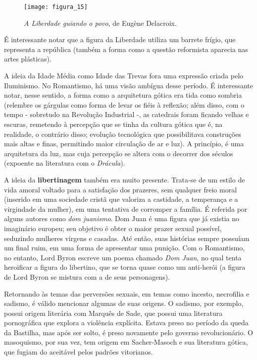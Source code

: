 \documentclass[12pt]{book}
\begin{document}
		\begin{figure}[h]
			\centering
			\texttt{[image: figura\_15]}
			\caption{\textit{A Liberdade guiando o povo}, de Eugène Delacroix.}
			\label{fig:mesh15}
		\end{figure}
		\par É interessante notar que a figura da Liberdade utiliza um barrete frígio, que representa a república (também a forma como a questão reformista aparecia nas artes plásticas).
		\par A ideia da Idade Média como Idade das Trevas fora uma expressão criada pelo Iluminismo. No Romantismo, há uma visão ambígua desse período. É interessante notar, nesse sentido, a forma como a arquitetura gótica era tida como sombria (relembre os gárgulas como forma de levar os fiéis à reflexão; além disso, com o tempo - sobretudo na Revolução Industrial -, as catedrais foram ficando velhas e escuras, remetendo à percepção que se tinha da cultura gótica que é, na realidade, o contrário disso; evolução tecnológica que possibilitava construções mais altas e finas, permitindo maior circulação de ar e luz). A princípio, é uma arquitetura da luz, mas cuja percepção se altera com o decorrer dos séculos (expoente na literatura com o \textit{Drácula}).
		\par A ideia da \textbf{libertinagem} também era muito presente. Trata-se de um estilo de vida amoral voltado para a satisfação dos prazeres, sem qualquer freio moral (inserido em uma sociedade cristã que valoriza a castidade, a temperança e a virgindade da mulher), em uma tentativa de corromper a família. É referida por alguns autores como \textit{dom juanismo}. Dom Juan é uma figura que já existia no imaginário europeu; seu objetivo é obter o maior prazer sexual possível, seduzindo mulheres virgens e casadas. Até então, suas histórias sempre possuíam um final ruim, em uma forma de apresentar uma punição. Com o Romantismo, no entanto, Lord Byron escreve um poema chamado \textit{Dom Juan}, no qual tenta heroificar a figura do libertino, que se torna quase como um anti-herói (a figura de Lord Byron se mistura com a de seus personagens).
		\par Retornando às temas das perversões sexuais, em temas como incesto, necrofilia e sadismo, é válido mencionar algumas de suas origens. O sadismo, por exemplo, possui origem literária com Marquês de Sade, que possui uma literatura pornográfica que explora a violência explícita. Estava preso no período da queda da Bastilha, mas após ser solto, é preso novamente pelo governo revolucionário. O masoquismo, por sua vez, tem origem em Sacher-Masoch e sua literatura gótica, que fugiam do aceitável pelos padrões vitorianos.
\end{document}
